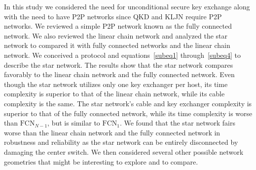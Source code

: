 \documentclass[a4paper,12pt,pdftex]{article}
\begin{document}
In this study we considered the need for unconditional secure key exchange along with the need to have P2P networks since QKD and KLJN require P2P networks. We reviewed a simple P2P network known as the fully connected network. We also reviewed the linear chain network and analyzed the star network to compared it with fully connected networks and the linear chain network. We conceived a protocol and equations~\eqref{subeq1} through~\eqref{subeq4} to describe the star network. The results show that the star network compares favorably to the linear chain network and the fully connected network. Even though the star network utilizes only one key exchanger per host, its time complexity is superior to that of the linear chain network, while its cable complexity is the same. The star network's cable and key exchanger complexity is superior to that of the fully connected network, while its time complexity is worse than $\mathrm{FCN}_{N-1}$, but is similar to $\mathrm{FCN}_{1}$. We found that the star network fairs worse than the linear chain network and the fully connected network in robustness and reliability as the star network can be entirely disconnected by damaging the center switch. We then considered several other possible network geometries that might be interesting to explore and to compare.
















\makeatletter
\renewcommand\@biblabel[1]{#1. }
\makeatother
\end{document}
